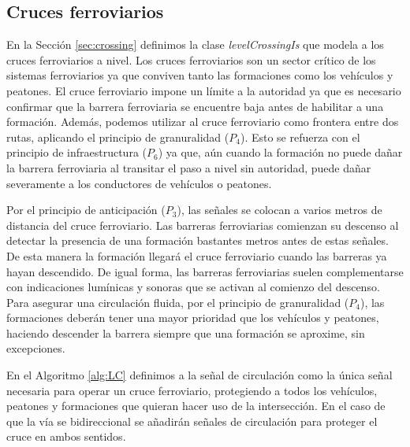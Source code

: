 \subsection{Cruces ferroviarios}
	
	\label{sec:sig_levelcrossing}
	
    
    En la Sección \ref{sec:crossing} definimos la clase \textit{levelCrossingIs} que modela a los cruces ferroviarios a nivel. Los cruces ferroviarios son un sector crítico de los sistemas ferroviarios ya que conviven tanto las formaciones como los vehículos y peatones. El cruce ferroviario impone un límite a la autoridad ya que es necesario confirmar que la barrera ferroviaria se encuentre baja antes de habilitar a una formación. Además, podemos utilizar al cruce ferroviario como frontera entre dos rutas, aplicando el principio de granuralidad ($P_4$). Esto se refuerza con el principio de infraestructura ($P_6$) ya que, aún cuando la formación no puede dañar la barrera ferroviaria al transitar el paso a nivel sin autoridad, puede dañar severamente a los conductores de vehículos o peatones.

    Por el principio de anticipación ($P_3$), las señales se colocan a varios metros de distancia del cruce ferroviario. Las barreras ferroviarias comienzan su descenso al detectar la presencia de una formación bastantes metros antes de estas señales. De esta manera la formación llegará el cruce ferroviario cuando las barreras ya hayan descendido. De igual forma, las barreras ferroviarias suelen complementarse con indicaciones lumínicas y sonoras que se activan al comienzo del descenso. Para asegurar una circulación fluida, por el principio de granuralidad ($P_4$), las formaciones deberán tener una mayor prioridad que los vehículos y peatones, haciendo descender la barrera siempre que una formación se aproxime, sin excepciones.

    En el Algoritmo \ref{alg:LC} definimos a la señal de circulación como la única señal necesaria para operar un cruce ferroviario, protegiendo a todos los vehículos, peatones y formaciones que quieran hacer uso de la intersección. En el caso de que la vía se bidireccional se añadirán señales de circulación para proteger el cruce en ambos sentidos.

